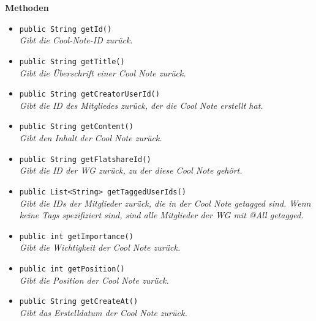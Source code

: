 	\textbf{Methoden}
	\begin{itemize}
		\item\texttt{{public String getId()}}\\
		\textit{Gibt die Cool-Note-ID zurück.}\\
		
		\item\texttt{{public String getTitle()}}\\
		\textit{Gibt die Überschrift einer Cool Note zurück.}\\
		
		\item\texttt{{public String getCreatorUserId()}}\\
		\textit{Gibt die ID des Mitgliedes zurück, der die Cool Note erstellt hat.}\\
		
		\item\texttt{{public String getContent()}}\\
		\textit{Gibt den Inhalt der Cool Note zurück.}\\
		
		\item\texttt{{public String getFlatshareId()}}\\
		\textit{Gibt die ID der WG zurück, zu der diese Cool Note gehört.}\\
		
		\item\texttt{{public List<String> getTaggedUserIds()}}\\
		\textit{Gibt die IDs der Mitglieder zurück, die in der Cool Note getagged sind. Wenn keine Tags spezifiziert sind, sind alle Mitglieder der WG mit @All getagged.}\\
		
		\item\texttt{public int getImportance()}\\
		\textit{Gibt die Wichtigkeit der Cool Note zurück.}\\
		
		\item\texttt{{public int getPosition()}}\\
		\textit{Gibt die Position der Cool Note zurück.}\\
		
		\item\texttt{{public String getCreateAt()}}\\
		\textit{Gibt das Erstelldatum der Cool Note zurück.}\\
	\end{itemize}

